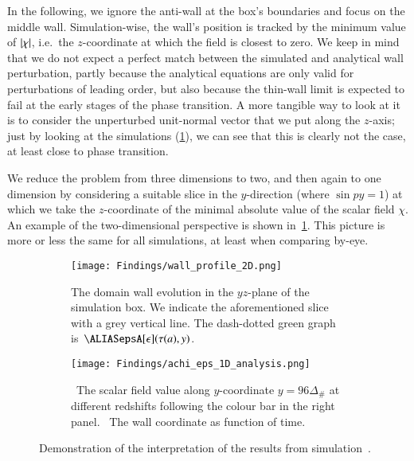 




In the following, we ignore the anti-wall at the box's boundaries and focus on the middle wall.
Simulation-wise, the wall's position is tracked by the minimum value of $\abs{\chi}$, i.e.~the $z$-coordinate at which the field is closest to zero. %
We keep in mind that we do not expect a perfect match between the simulated and analytical wall perturbation, partly because the analytical equations are only valid for perturbations of leading order, but also because the thin-wall limit is expected to fail at the early stages of the phase transition. A more tangible way to look at it is to consider the unperturbed unit-normal vector that we put along the $z$-axis; just by looking at the simulations (\cref{fig:results:epsilon:wall_profile_2D}), we can see that this is clearly not the case, at least close to phase transition.


We reduce the problem from three dimensions to two, and then again to one dimension by considering a suitable slice in the $y$-direction %
(where $\sin{py} =1$) %
at which we take the $z$-coordinate of the minimal absolute value of the scalar field $\chi$. An example of the two-dimensional perspective is shown in~\cref{fig:results:epsilon:wall_profile_2D}. This picture is more or less the same for all simulations, at least when comparing by-eye. 

\begin{figure}[ht]
    \centering
    \begin{subfigure}[b]{\linewidth}
        \centering
        \texttt{[image: Findings/wall\_profile\_2D.png]}
        \caption{The domain wall evolution in the $yz$-plane of the simulation box. We indicate the aforementioned slice with a grey vertical line. The dash-dotted green graph is~$\epsA[\epsilon](\tau(a), y)$.}
        \label{fig:results:epsilon:wall_profile_2D}
    \end{subfigure}
    \hfill
    \begin{subfigure}[b]{\linewidth}
        \centering
        \texttt{[image: Findings/achi\_eps\_1D\_analysis.png]}
        \caption{~The scalar field value along $y$-coordinate $y=96\Delta_\#$ at different redshifts following the colour bar in the right panel. ~The wall coordinate as function of time.}
        \label{fig:results:epsilon:achi_eps_1D_analysis}
    \end{subfigure}
    \caption{Demonstration of the interpretation of the results from simulation~.}
    \label{fig:results:epsilon:from_achi_to_epsilon}
\end{figure}


